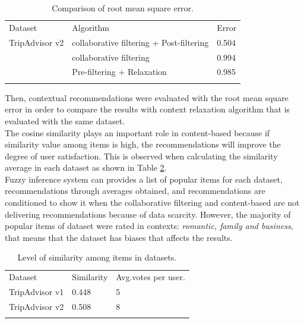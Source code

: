 \begin{table}
\centering
\small
\captionsetup{font=footnotesize}
\caption{Comparison of root mean square error.}
\label{tab:4}  
\small   
\begin{tabular}{lll}
\hline\noalign{\smallskip}
Dataset & Algorithm & Error \\
\noalign{\smallskip}\hline\noalign{\smallskip}
TripAdvisor v2 & collaborative filtering + Post-filtering  & 0.504  \\
                        & collaborative filtering                           & 0.994  \\
                        & Pre-filtering + Relaxation                     & 0.985  \\
\noalign{\smallskip}\hline
\end{tabular}
\end{table}
Then, contextual recommendations were evaluated with the 
root mean square error in order to compare the results with context 
relaxation algorithm  \cite{zheng2012differential} that is evaluated 
with the same dataset.\\ 
The cosine similarity plays an important role in content-based because
if similarity value among items is high, the recommendations will
improve the degree of user satisfaction. This is observed when
calculating the similarity average in each dataset as shown in 
Table  \ref{tab:5}.\\ 
Fuzzy inference system can provides a list of popular items for each dataset,
recommendations through averages obtained, and recommendations are
conditioned to show it when the collaborative filtering and content-based 
are not delivering recommendations because of data scarcity.
However, the majority of popular items of dataset were rated in contexts: 
\textit{romantic, family and business}, that means that the dataset has
biases that affects the results.

\begin{table}
\centering
\small
\captionsetup{font=footnotesize}
\caption{Level of similarity among items in datasets. }
\label{tab:5}      
\begin{tabular}{lll}
\hline\noalign{\smallskip}
Dataset  & Similarity  & Avg.votes per user. \\
\noalign{\smallskip}\hline\noalign{\smallskip}
TripAdvisor v1 & 0.448  & 5  \\
TripAdvisor v2 & 0.508  & 8  \\
\noalign{\smallskip}\hline
\end{tabular}
\end{table}

